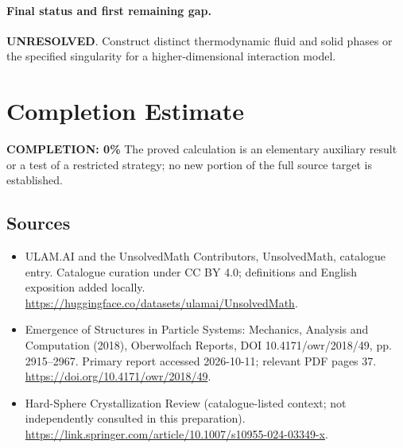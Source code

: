 \documentclass[11pt]{article}
\begin{document}
\paragraph{Final status and first remaining gap.}
\textbf{UNRESOLVED}. Construct distinct thermodynamic fluid and solid phases or the specified singularity for a higher-dimensional interaction model.

\section{Completion Estimate}
\noindent\textbf{COMPLETION: 0\%}
The proved calculation is an elementary auxiliary result or a test of a restricted strategy; no new portion of the full source target is established.

\subsection{Sources}
\begin{itemize}
\item[\hypertarget{source:statement:1}{S1}] ULAM.AI and the UnsolvedMath Contributors, UnsolvedMath, catalogue entry. Catalogue curation under CC BY 4.0; definitions and English exposition added locally.
\url{https://huggingface.co/datasets/ulamai/UnsolvedMath}.
\item[\hypertarget{source:statement:2}{S2}] Emergence of Structures in Particle Systems: Mechanics, Analysis and Computation (2018), Oberwolfach Reports, DOI 10.4171/owr/2018/49, pp. 2915--2967. Primary report accessed 2026-10-11; relevant PDF pages 37.
\url{https://doi.org/10.4171/owr/2018/49}.
\item[\hypertarget{source:statement:3}{S3}] Hard-Sphere Crystallization Review (catalogue-listed context; not independently consulted in this preparation).
\url{https://link.springer.com/article/10.1007/s10955-024-03349-x}.
\end{itemize}
\label{end:statement}
\end{document}
